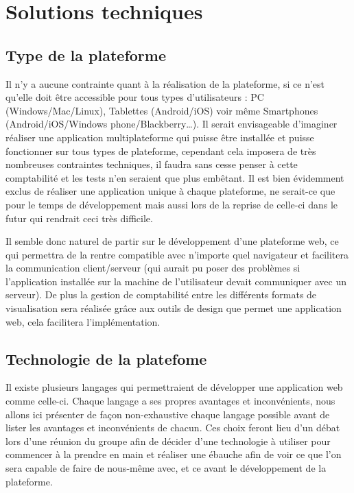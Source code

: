 \section{Solutions techniques}
\label{sec:technique}

    \subsection{Type de la plateforme}
    \label{subsec:plateforme}
    Il n’y a aucune contrainte quant à la réalisation de la plateforme, si ce n’est qu’elle doit être accessible
    pour tous types d’utilisateurs : PC (Windows/Mac/Linux), Tablettes (Android/iOS) voir même Smartphones
    (Android/iOS/Windows phone/Blackberry…). Il serait envisageable d’imaginer réaliser une application multiplateforme
    qui puisse être installée et puisse fonctionner sur tous types de plateforme, cependant cela imposera
    de très nombreuses contraintes techniques, il faudra sans cesse penser à cette comptabilité et les tests
    n’en seraient que plus embêtant. Il est bien évidemment exclus de réaliser une application unique à chaque plateforme,
    ne serait-ce que pour le temps de développement mais aussi lors de la reprise de celle-ci dans le futur qui rendrait
    ceci très difficile.

    Il semble donc naturel de partir sur le développement d’une plateforme web, ce qui permettra de la rentre compatible
    avec n’importe quel navigateur et facilitera la communication client/serveur (qui aurait pu poser des problèmes
    si l’application installée sur la machine de l’utilisateur devait communiquer avec un serveur). De plus la gestion
    de comptabilité entre les différents formats de visualisation sera réalisée grâce aux outils de design que permet
    une application web, cela facilitera l’implémentation.

    \subsection{Technologie de la platefome}
    \label{subsec:technologie}
    Il existe plusieurs langages qui permettraient de développer une application web comme celle-ci.
    Chaque langage a ses propres avantages et inconvénients, nous allons ici présenter de façon non-exhaustive
    chaque langage possible avant de lister les avantages et inconvénients de chacun. Ces choix feront lieu
    d’un débat lors d’une réunion du groupe afin de décider d’une technologie à utiliser pour commencer
    à la prendre en main et réaliser une ébauche afin de voir ce que l’on sera capable de faire de nous-même
    avec, et ce avant le développement de la plateforme.


